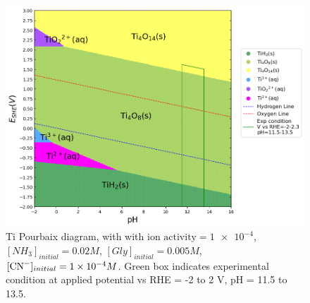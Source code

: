 \documentclass[journal=jacsat,manuscript=article]{achemso}
\begin{document}
\begin{figure}
    \centering
    \includegraphics[width=0.6\linewidth]{Figures/pourbaix_diagrams/Ti-NH3-H2O_activity=1e-04_[NH3]=0.02M_[Gly]=0.005M_[CN]=0.0001.png}
    \caption{Ti Pourbaix diagram, with with $\text{ion activity}=\num{1e-4}$,$[NH_3]_{initial}= 0.02M$, $[Gly]_{initial}=0.005M$, $[\ce{CN-}]_{initial}=\num{1e-4}M$. Green box indicates experimental condition at applied potential vs RHE = -2 to 2 V, pH = 11.5 to 13.5.}
    \label{fig:Ti_Pourbaix}
\end{figure}
\end{document}
